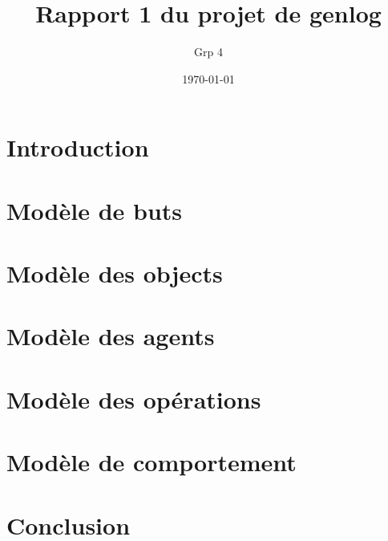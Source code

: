 \documentclass[12pt]{article}
\title{Rapport 1 du projet de genlog}
\author{Grp 4}
\date{\today}
\begin{document}
\maketitle

\section*{Introduction}
	

\section{Modèle de buts}
	

\section{Modèle des objects}
	

\section{Modèle des agents}
	

\section{Modèle des opérations}
	

\section{Modèle de comportement}
	

\section*{Conclusion}
	
\end{document}
